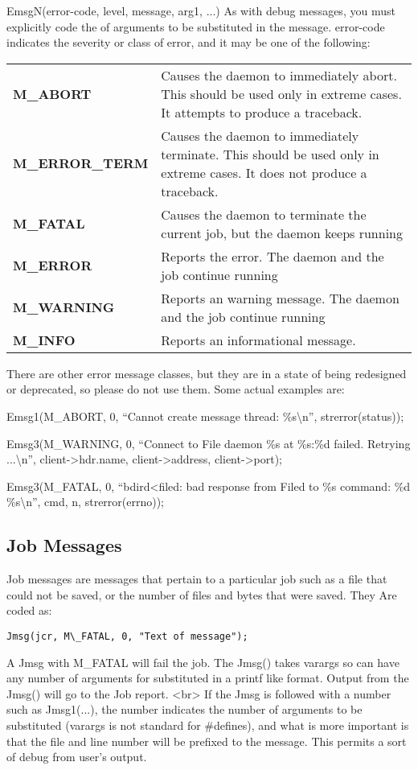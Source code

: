 EmsgN(error-code, level, message, arg1, ...) As with debug messages, you must
explicitly code the of arguments to be substituted in the message. error-code
indicates the severity or class of error, and it may be one of the following:

\begin{longtable}{lp{3in}}
{{\bf M\_ABORT} } & {Causes the daemon to immediately abort. This should be
used only  in extreme cases. It attempts to produce a  traceback. } \\
{{\bf M\_ERROR\_TERM} } & {Causes the daemon to immediately terminate. This
should be used only  in extreme cases. It does not produce a  traceback. } \\
{{\bf M\_FATAL} } & {Causes the daemon to terminate the current job, but the
daemon keeps running } \\
{{\bf M\_ERROR} } & {Reports the error. The daemon and the job continue
running } \\
{{\bf M\_WARNING} } & {Reports an warning message. The daemon and the job
continue running } \\
{{\bf M\_INFO} } & {Reports an informational message.}

\end{longtable}

There are other error message classes, but they are in a state of being
redesigned or deprecated, so please do not use them. Some actual examples are:


Emsg1(M\_ABORT, 0, ``Cannot create message thread: \%s\textbackslash{}n'',
strerror(status));

Emsg3(M\_WARNING, 0, ``Connect to File daemon \%s at \%s:\%d failed. Retrying
...\textbackslash{}n'',  client-{\textgreater}hdr.name, client-{\textgreater}address,
client-{\textgreater}port);

Emsg3(M\_FATAL, 0, ``bdird{\textless}filed: bad response from Filed to \%s command:
\%d \%s\textbackslash{}n'',  cmd, n, strerror(errno));

\subsection{Job Messages}

Job messages are messages that pertain to a particular job such as a file that
could not be saved, or the number of files and bytes that were saved. They
Are coded as:
\begin{verbatim}
Jmsg(jcr, M\_FATAL, 0, "Text of message");
\end{verbatim}
A Jmsg with M\_FATAL will fail the job. The Jmsg() takes varargs so can
have any number of arguments for substituted in a printf like format.
Output from the Jmsg() will go to the Job report.
<br>
If the Jmsg is followed with a number such as Jmsg1(...), the number
indicates the number of arguments to be substituted (varargs is not
standard for \#defines), and what is more important is that the file and
line number will be prefixed to the message. This permits a sort of debug
from user's output.

